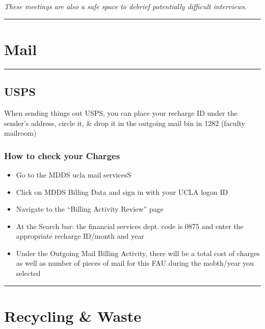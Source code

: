 \documentclass[
]{book}
\providecommand{\tightlist}{%
  \setlength{\itemsep}{0pt}\setlength{\parskip}{0pt}}
\begin{document}
\emph{These meetings are also a safe space to debrief potentially difficult interviews.}

\begin{center}\rule{0.5\linewidth}{0.5pt}\end{center}

\hypertarget{mail}{%
\section{Mail}\label{mail}}

\begin{center}\rule{0.5\linewidth}{0.5pt}\end{center}

\hypertarget{usps}{%
\subsection{USPS}\label{usps}}

When sending things out USPS, you can place your recharge ID under the sender's address, circle it, \& drop it in the outgoing mail bin in 1282 (faculty mailroom)

\hypertarget{how-to-check-your-charges}{%
\subsubsection{How to check your Charges}\label{how-to-check-your-charges}}

\begin{itemize}
\tightlist
\item
  Go to the MDDS ucla mail servicesS
\item
  Click on MDDS Billing Data and sign in with your UCLA logon ID
\item
  Navigate to the ``Billing Activity Review'' page
\item
  At the Search bar: the financial services dept. code is 0875 and enter the appropriate recharge ID/month and year
\item
  Under the Outgoing Mail Billing Activity, there will be a total cost of charges as well as number of pieces of mail for this FAU during the mobth/year you selected
\end{itemize}

\begin{center}\rule{0.5\linewidth}{0.5pt}\end{center}

\hypertarget{recycling-waste}{%
\section{Recycling \& Waste}\label{recycling-waste}}
\end{document}
